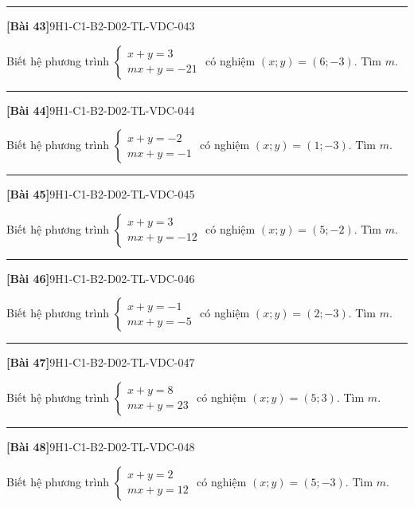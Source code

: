 \documentclass[12pt,a4paper]{article}
\newif\ifloigiai
\newenvironment{cauhoi}[2]{%
  \par\medskip\noindent\rule{\textwidth}{0.4pt}\par\nopagebreak
  \noindent\textbf{[#1]}\hfill{\scriptsize\ttfamily #2}\par\nopagebreak\smallskip}{\par}
\newcommand{\loigiai}[1]{\ifloigiai\par\smallskip\noindent\textit{Lời giải.} #1\par\fi}
\begin{document}
\begin{cauhoi}{Bài 43}{9H1-C1-B2-D02-TL-VDC-043}
Biết hệ phương trình $\begin{cases}x+y=3\\ mx+y=-21\end{cases}$ có nghiệm $(x;y)=(6;-3)$. Tìm $m$.
\loigiai{Thay $x=6$, $y=-3$ vào phương trình thứ hai: $6 m-3=-21$ nên $m=\dfrac{-21+3}{6}=-3$.}
\end{cauhoi}
\begin{cauhoi}{Bài 44}{9H1-C1-B2-D02-TL-VDC-044}
Biết hệ phương trình $\begin{cases}x+y=-2\\ mx+y=-1\end{cases}$ có nghiệm $(x;y)=(1;-3)$. Tìm $m$.
\loigiai{Thay $x=1$, $y=-3$ vào phương trình thứ hai: $1 m-3=-1$ nên $m=\dfrac{-1+3}{1}=2$.}
\end{cauhoi}
\begin{cauhoi}{Bài 45}{9H1-C1-B2-D02-TL-VDC-045}
Biết hệ phương trình $\begin{cases}x+y=3\\ mx+y=-12\end{cases}$ có nghiệm $(x;y)=(5;-2)$. Tìm $m$.
\loigiai{Thay $x=5$, $y=-2$ vào phương trình thứ hai: $5 m-2=-12$ nên $m=\dfrac{-12+2}{5}=-2$.}
\end{cauhoi}
\begin{cauhoi}{Bài 46}{9H1-C1-B2-D02-TL-VDC-046}
Biết hệ phương trình $\begin{cases}x+y=-1\\ mx+y=-5\end{cases}$ có nghiệm $(x;y)=(2;-3)$. Tìm $m$.
\loigiai{Thay $x=2$, $y=-3$ vào phương trình thứ hai: $2 m-3=-5$ nên $m=\dfrac{-5+3}{2}=-1$.}
\end{cauhoi}
\begin{cauhoi}{Bài 47}{9H1-C1-B2-D02-TL-VDC-047}
Biết hệ phương trình $\begin{cases}x+y=8\\ mx+y=23\end{cases}$ có nghiệm $(x;y)=(5;3)$. Tìm $m$.
\loigiai{Thay $x=5$, $y=3$ vào phương trình thứ hai: $5 m+3=23$ nên $m=\dfrac{23-3}{5}=4$.}
\end{cauhoi}
\begin{cauhoi}{Bài 48}{9H1-C1-B2-D02-TL-VDC-048}
Biết hệ phương trình $\begin{cases}x+y=2\\ mx+y=12\end{cases}$ có nghiệm $(x;y)=(5;-3)$. Tìm $m$.
\loigiai{Thay $x=5$, $y=-3$ vào phương trình thứ hai: $5 m-3=12$ nên $m=\dfrac{12+3}{5}=3$.}
\end{cauhoi}
\end{document}
